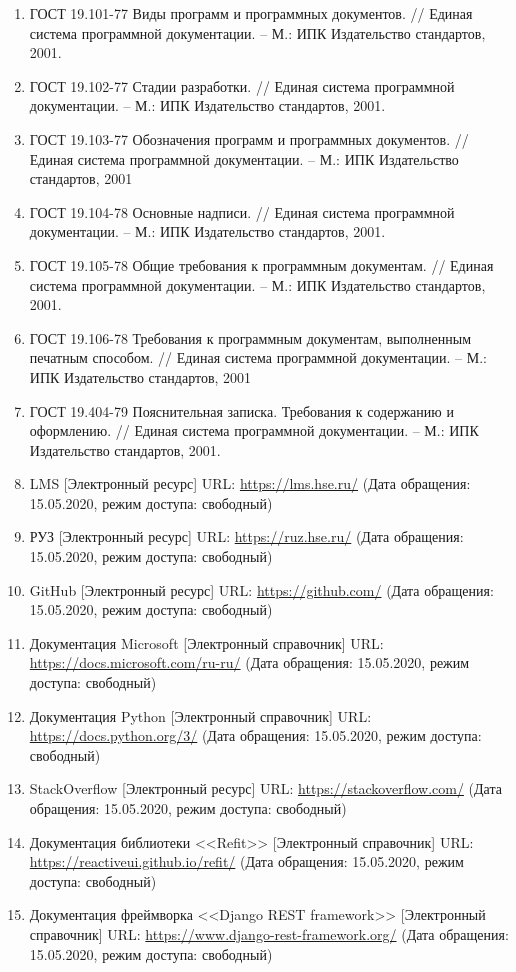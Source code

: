 \documentclass{../includes/TechDoc}
\begin{document}
    \begin{enumerate}
        \item ГОСТ 19.101-77 Виды программ и программных документов. // Единая система программной документации. – М.: ИПК Издательство стандартов, 2001.
        \item ГОСТ 19.102-77 Стадии разработки. // Единая система программной документации. – М.: ИПК Издательство стандартов, 2001.
        \item ГОСТ 19.103-77 Обозначения программ и программных документов. // Единая система программной документации. – М.: ИПК Издательство стандартов, 2001
        \item ГОСТ 19.104-78 Основные надписи. // Единая система программной документации. – М.: ИПК Издательство стандартов, 2001.
        \item ГОСТ 19.105-78 Общие требования к программным документам. // Единая система программной документации. – М.: ИПК Издательство стандартов, 2001.
        \item ГОСТ 19.106-78 Требования к программным документам, выполненным печатным способом. // Единая система программной документации. – М.: ИПК Издательство стандартов, 2001
        \item ГОСТ 19.404-79 Пояснительная записка. Требования к содержанию и оформлению. // Единая система программной документации. – М.: ИПК Издательство стандартов, 2001.
        \item LMS [Электронный ресурс] URL: \url{https://lms.hse.ru/} (Дата обращения: 15.05.2020, режим доступа: свободный)
        \item РУЗ [Электронный ресурс] URL: \url{https://ruz.hse.ru/} (Дата обращения: 15.05.2020, режим доступа: свободный)
        \item GitHub [Электронный ресурс] URL: \url{https://github.com/} (Дата обращения: 15.05.2020, режим доступа: свободный)
        \item Документация Microsoft [Электронный справочник] URL: \url{https://docs.microsoft.com/ru-ru/} (Дата обращения: 15.05.2020, режим доступа: свободный)
        \item Документация Python [Электронный справочник] URL: \url{https://docs.python.org/3/} (Дата обращения: 15.05.2020, режим доступа: свободный)
        \item StackOverflow [Электронный ресурс] URL: \url{https://stackoverflow.com/} (Дата обращения: 15.05.2020, режим доступа: свободный)
        \item Документация библиотеки <<Refit>> [Электронный справочник] URL: \url{https://reactiveui.github.io/refit/} (Дата обращения: 15.05.2020, режим доступа: свободный)
        \item Документация фреймворка <<Django REST framework>> [Электронный справочник] URL: \url{https://www.django-rest-framework.org/} (Дата обращения: 15.05.2020, режим доступа: свободный)
    \end{enumerate}


    \registrationList
\end{document}
